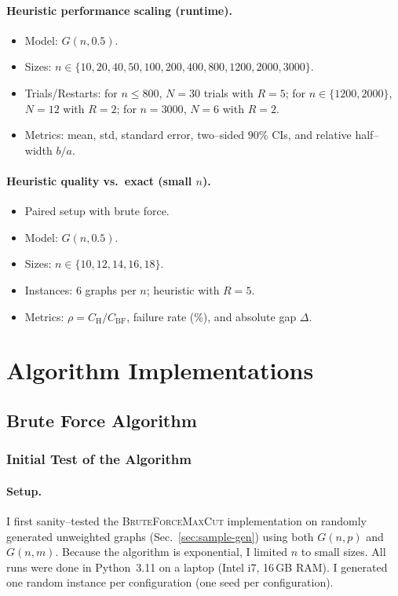 \documentclass[12pt]{article}
\begin{document}
\paragraph{Heuristic performance scaling (runtime).}
\begin{itemize}
  \item Model: $G(n,0.5)$.
  \item Sizes: $n\in\{10,20,40,50,100,200,400,800,1200,2000,3000\}$.
  \item Trials/Restarts: for $n\le 800$, $N=30$ trials with $R=5$; for $n\in\{1200,2000\}$, $N=12$ with $R=2$; for $n=3000$, $N=6$ with $R=2$.
  \item Metrics: mean, std, standard error, two–sided $90\%$ CIs, and relative half–width $b/a$.
\end{itemize}

\paragraph{Heuristic quality vs.\ exact (small $n$).}
\begin{itemize}
  \item Paired setup with brute force.
  \item Model: $G(n,0.5)$.
  \item Sizes: $n\in\{10,12,14,16,18\}$.
  \item Instances: $6$ graphs per $n$; heuristic with $R=5$.
  \item Metrics: $\rho=C_{\mathrm H}/C_{\mathrm{BF}}$, failure rate (\%), and absolute gap $\Delta$.
\end{itemize}


\section{Algorithm Implementations}

\subsection{Brute Force Algorithm}
\subsubsection*{Initial Test of the Algorithm}
\paragraph{Setup.}
I first sanity–tested the \textsc{BruteForceMaxCut} implementation on randomly
generated unweighted graphs (Sec.~\ref{sec:sample-gen}) using both $G(n,p)$ and $G(n,m)$.
Because the algorithm is exponential, I limited $n$ to small sizes.
All runs were done in Python~3.11 on a laptop (Intel i7, 16\,GB RAM).
I generated one random instance per configuration (one seed per configuration).
\end{document}
